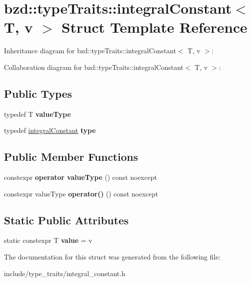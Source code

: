 \hypertarget{structbzd_1_1typeTraits_1_1integralConstant}{}\section{bzd\+:\+:type\+Traits\+:\+:integral\+Constant$<$ T, v $>$ Struct Template Reference}
\label{structbzd_1_1typeTraits_1_1integralConstant}


Inheritance diagram for bzd\+:\+:type\+Traits\+:\+:integral\+Constant$<$ T, v $>$\+:


Collaboration diagram for bzd\+:\+:type\+Traits\+:\+:integral\+Constant$<$ T, v $>$\+:
\subsection*{Public Types}
\begin{DoxyCompactItemize}
\item 
\mbox{\label{structbzd_1_1typeTraits_1_1integralConstant_a25f8639da0d0702b714b2ae46e7b2831}} 
typedef T {\bfseries value\+Type}
\item 
\mbox{\label{structbzd_1_1typeTraits_1_1integralConstant_a9f27fd41bacb9695bdb0068eaeb13742}} 
typedef \hyperlink{structbzd_1_1typeTraits_1_1integralConstant}{integral\+Constant} {\bfseries type}
\end{DoxyCompactItemize}
\subsection*{Public Member Functions}
\begin{DoxyCompactItemize}
\item 
\mbox{\label{structbzd_1_1typeTraits_1_1integralConstant_afe505065d9034110fb3a385c0a81ea16}} 
constexpr {\bfseries operator value\+Type} () const noexcept
\item 
\mbox{\label{structbzd_1_1typeTraits_1_1integralConstant_a7f97a49b251bab219b3552efbffbeab1}} 
constexpr value\+Type {\bfseries operator()} () const noexcept
\end{DoxyCompactItemize}
\subsection*{Static Public Attributes}
\begin{DoxyCompactItemize}
\item 
\mbox{\label{structbzd_1_1typeTraits_1_1integralConstant_a614e5b5b8d73d1c5a5f63b5ad8fa5841}} 
static constexpr T {\bfseries value} = v
\end{DoxyCompactItemize}


The documentation for this struct was generated from the following file\+:\begin{DoxyCompactItemize}
\item 
include/type\+\_\+traits/integral\+\_\+constant.\+h\end{DoxyCompactItemize}
